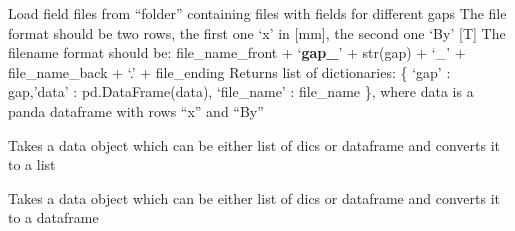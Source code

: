 \documentclass[letterpaper,10pt,english]{sphinxmanual}
\begin{document}
\begin{fulllineitems}
\label{\detokenize{autoapi/unduwave/helpers/bfield_helpers/index:unduwave.helpers.bfield_helpers.load_b_fields_gap}}
\pysigstartsignatures
{}
\pysigstopsignatures
\sphinxAtStartPar
Load field files from “folder” containing files with fields for different gaps
The file format should be two rows, the first one ‘x’ in {[}mm{]}, the second one ‘By’ {[}T{]}
The file\sphinxhyphen{}name format should be: file\_name\_front + ‘{\color{red}\bfseries{}gap\_}’ + str(gap) + ‘\_’ + file\_name\_back + ‘.’ + file\_ending
Returns list of dictionaries: \{ ‘gap’ : gap,’data’ : pd.DataFrame(data), ‘file\_name’ : file\_name \}, where data is a panda dataframe with rows
“x” and “By”

\end{fulllineitems}


\begin{fulllineitems}
\label{\detokenize{autoapi/unduwave/helpers/bfield_helpers/index:unduwave.helpers.bfield_helpers.checkIfList_Conv}}
\pysigstartsignatures
{}
\pysigstopsignatures
\sphinxAtStartPar
Takes a data object which can be either list of dics or dataframe and converts
it to a list

\end{fulllineitems}


\begin{fulllineitems}
\label{\detokenize{autoapi/unduwave/helpers/bfield_helpers/index:unduwave.helpers.bfield_helpers.checkIfDF_Conv}}
\pysigstartsignatures
{}
\pysigstopsignatures
\sphinxAtStartPar
Takes a data object which can be either list of dics or dataframe and converts
it to a dataframe

\end{fulllineitems}
\end{document}
